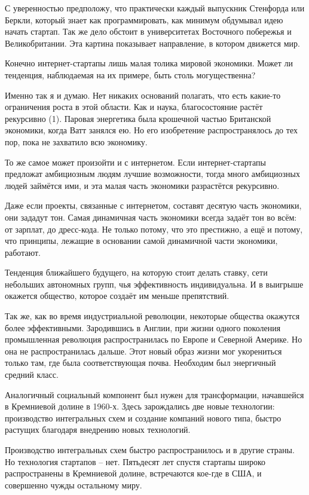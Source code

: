 \documentclass[ebook,12pt,oneside,openany]{memoir}
\begin{document}
С уверенностью предположу, что практически каждый выпускник Стенфорда
или Беркли, который знает как программировать, как минимум обдумывал
идею начать стартап. Так же дело обстоит в университетах Восточного
побережья и Великобритании. Эта картина показывает направление, в
котором движется мир.

Конечно интернет-стартапы лишь малая толика мировой экономики. Может
ли тенденция, наблюдаемая на их примере, быть столь могущественна?

Именно так я и думаю. Нет никаких оснований полагать, что есть
какие-то ограничения роста в этой области. Как и наука, благосостояние
растёт рекурсивно (1). Паровая энергетика была крошечной частью
Британской экономики, когда Ватт занялся ею. Но его изобретение
распространялось до тех пор, пока не захватило всю экономику.

То же самое может произойти и с интернетом. Если интернет-стартапы
предложат амбициозным людям лучшие возможности, тогда много
амбициозных людей займётся ими, и эта малая часть экономики
разрастётся рекурсивно.

Даже если проекты, связанные с интернетом, составят десятую часть
экономики, они зададут тон. Самая динамичная часть экономики всегда
задаёт тон во всём: от зарплат, до дресс-кода. Не только потому, что
это престижно, а ещё и потому, что принципы, лежащие в основании самой
динамичной части экономики, работают.

Тенденция ближайшего будущего, на которую стоит делать ставку, сети
небольших автономных групп, чья эффективность индивидуальна. И в
выигрыше окажется общество, которое создаёт им меньше препятствий.

Так же, как во время индустриальной революции, некоторые общества
окажутся более эффективными. Зародившись в Англии, при жизни одного
поколения промышленная революция распространилась по Европе и Северной
Америке. Но она не распространилась дальше. Этот новый образ жизни мог
укорениться только там, где была соответствующая почва. Необходим был
энергичный средний класс.

Аналогичный социальный компонент был нужен для трансформации,
начавшейся в Кремниевой долине в 1960-х. Здесь зарождались две новые
технологии: производство интегральных схем и создание компаний нового
типа, быстро растущих благодаря внедрению новых технологий.

Производство интегральных схем быстро распространилось и в другие
страны. Но технология стартапов – нет. Пятьдесят лет спустя стартапы
широко распространены в Кремниевой долине, встречаются кое-где в США,
и совершенно чужды остальному миру.
\end{document}
